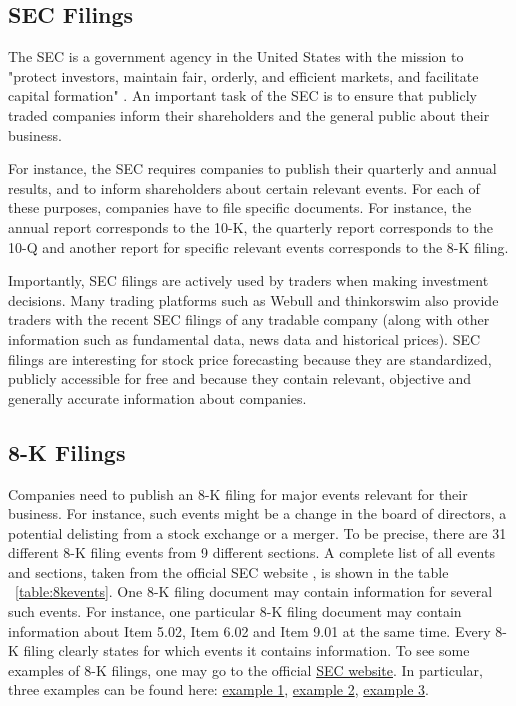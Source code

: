\documentclass{article}
\begin{document}
	\subsection{SEC Filings}
	
	The SEC is a government agency in the United States with the mission to "protect investors, maintain fair, orderly, and efficient markets, and facilitate capital formation" \cite{noauthor_sec.gov_nodate}. An important task of the SEC is to ensure that publicly traded companies inform their shareholders and the general public about their business.
	
	For instance, the SEC requires companies to publish their quarterly and annual results, and to inform shareholders about certain relevant events. For each of these purposes, companies have to file specific documents. For instance, the annual report corresponds to the 10-K, the quarterly report corresponds to the 10-Q and another report for specific relevant events corresponds to the 8-K filing.
	
	Importantly, SEC filings are actively used by traders when making investment decisions. Many trading platforms such as Webull and thinkorswim also provide traders with the recent SEC filings of any tradable company (along with other information such as fundamental data, news data and historical prices). SEC filings are interesting for stock price forecasting because they are standardized, publicly accessible for free and because they contain relevant, objective and generally accurate information about companies.
	
	
	\subsection{8-K Filings}
	
	Companies need to publish an 8-K filing for major events relevant for their business. For instance, such events might be a change in the board of directors, a potential delisting from a stock exchange or a merger. To be precise, there are 31 different 8-K filing events from 9 different sections. A complete list of all events and sections, taken from the official SEC website \cite{noauthor_sec.gov_nodate-1}, is shown in the table ~\ref{table:8kevents}. One 8-K filing document may contain information for several such events. For instance, one particular 8-K filing document may contain information about Item 5.02, Item 6.02 and Item 9.01 at the same time. Every 8-K filing clearly states for which events it contains information. To see some examples of 8-K filings, one may go to the official  \href{https://www.sec.gov/cgi-bin/browse-edgar?company=&CIK=&type=8-K&owner=include&count=40&action=getcurrent}{SEC website}. In particular, three examples can be found here: \href{https://www.sec.gov/ix?doc=/Archives/edgar/data/1339947/000119312519299728/d840037d8k.htm}{example 1}, \href{https://www.sec.gov/Archives/edgar/data/883975/000149315219018330/form8-k.htm}{example 2}, \href{https://www.sec.gov/Archives/edgar/data/1419275/000118518519001650/greenbox20191125_8k.htm}{example 3}.
	
\end{document}
